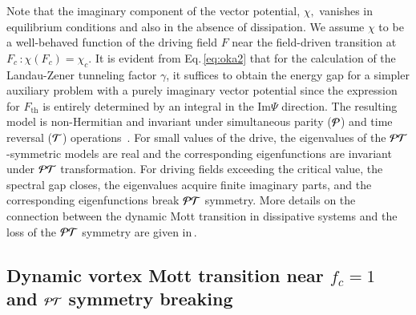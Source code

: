 \documentclass[aps,twocolumn,prl,10pt,amsmath,amssymb,nofootinbib,showpacs,superscriptaddress,floatfix]{revtex4-1}
\begin{document}
Note that the imaginary component of the vector potential, $\chi,$ vanishes in 
equilibrium conditions and also in the absence of dissipation. We assume $\chi$ to be a well-behaved 
function of the driving field $F$ near the field-driven transition at $F_{c}$\,:\,$\chi(F_{c})=\chi_{c}.$
It is evident from Eq.\,\eqref{eq:oka2} that for the calculation of
the Landau-Zener tunneling factor $\gamma$, it suffices to obtain
the energy gap for a simpler auxiliary problem with a purely imaginary
vector potential since the expression for $F_{\text{th}}$ is entirely determined by an integral in the $\text{Im}\Psi$ direction. 
The resulting model is non-Hermitian and invariant under
simultaneous parity (${\cal P}$) and time reversal (${\cal T}$)
operations~\cite{tripathi}. For small values of the drive, the eigenvalues of the
${\cal PT}$-symmetric models are real and the corresponding eigenfunctions
are invariant under ${\cal PT}$ transformation. For driving fields
exceeding the critical value, the spectral gap closes, the eigenvalues
acquire finite imaginary parts, and the corresponding eigenfunctions
break ${\cal PT}$ symmetry. More details on the connection between the dynamic Mott transition in dissipative systems and the loss of the ${\cal PT}$ symmetry are given in\,\cite{tripathi}.


\subsection{Dynamic vortex Mott transition near $f_{c}=1$ and ${\cal PT}$ symmetry
	breaking }
\end{document}

